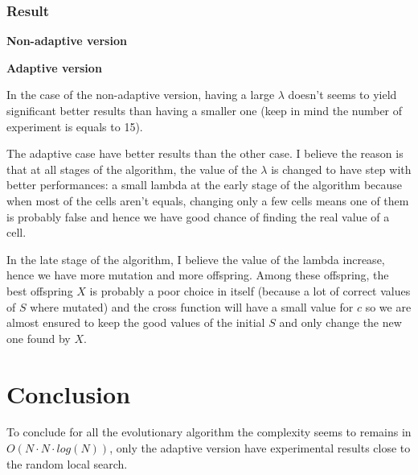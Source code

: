 \documentclass[12pt]{article}
\theoremstyle{definition}
\theoremstyle{plain}
\theoremstyle{remark}
\begin{document}
\subsubsection{Result}

\textbf{Non-adaptive version}


\textbf{Adaptive version}


In the case of the non-adaptive version, having a large $\lambda$ doesn't seems to yield significant better results than having a smaller one (keep in mind the number of experiment is equals to 15).

The adaptive case have better results than the other case. I believe the reason is that at all stages of the algorithm, the value of the $\lambda$ is changed to have step with better performances: a small lambda at the early stage of the algorithm because when most of the cells aren't equals, changing only a few cells means one of them is probably false and hence we have good chance of finding the real value of a cell.

In the late stage of the algorithm, I believe the value of the lambda increase, hence we have more mutation and more offspring. Among these offspring, the best offspring $X$ is probably a poor choice in itself (because a lot of correct values of $S$ where mutated) and the cross function will have a small value for $c$ so we are almost ensured to keep the good values of the initial $S$ and only change the new one found by $X$.

\section{Conclusion}
To conclude for all the evolutionary algorithm the complexity seems to remains in $O(N \cdot N \cdot log(N))$, only the adaptive version have experimental results close to the random local search.
\end{document}
